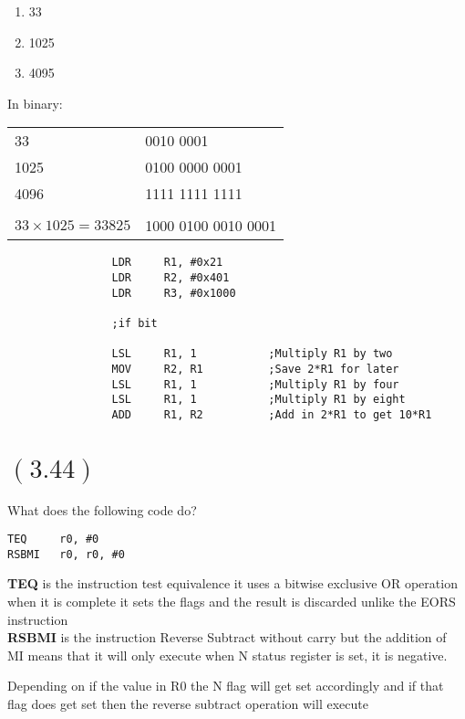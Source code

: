 \documentclass[letterpaper,12pt,titlepage]{article}
\begin{document}
\begin{enumerate}[label=\Alph*]
\item 33
\item 1025
\item 4095
\end{enumerate}

\begin{mdframed}[style=MyFrame]
In binary: \\
\begin{tabular}{l l }
33 & 0010 0001 \\
1025 & 0100 0000 0001 \\
4096 & 1111 1111 1111 \\ \\
$33\times 1025 = 33825$ & 1000 0100 0010 0001
\end{tabular}

\begin{verbatim}
				LDR		R1, #0x21
				LDR		R2, #0x401
				LDR 	R3, #0x1000
				
				;if bit 
				 
                LSL     R1, 1           ;Multiply R1 by two
                MOV     R2, R1          ;Save 2*R1 for later
                LSL     R1, 1           ;Multiply R1 by four
                LSL     R1, 1           ;Multiply R1 by eight
                ADD     R1, R2          ;Add in 2*R1 to get 10*R1
\end{verbatim}
\end{mdframed}

\section*{$(3.44)$} What does the following code do?
\begin{verbatim}
TEQ     r0, #0
RSBMI   r0, r0, #0
\end{verbatim}

\begin{mdframed}[style=MyFrame]
\textbf{TEQ} is the instruction test equivalence it uses a bitwise exclusive OR operation when it is complete it sets the flags and the result is discarded unlike the EORS instruction\\
\textbf{RSBMI} is the instruction Reverse Subtract without carry but the addition of MI means that it will only execute when N status register is set, it is negative. 

Depending on if the value in R0 the N flag will get set accordingly and if that flag does get set then the reverse subtract operation will execute 
\end{mdframed}
\end{document}
